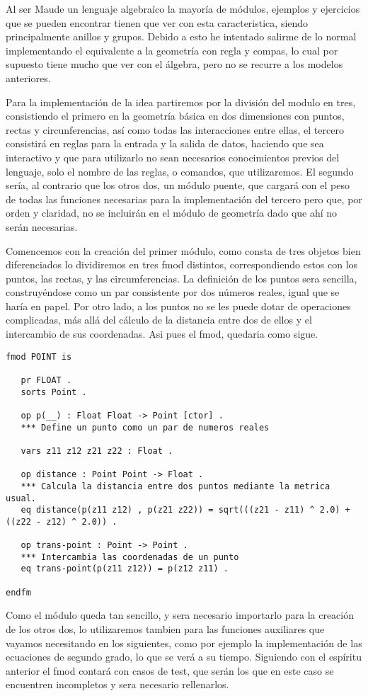 
Al ser Maude un lenguaje algebraíco la mayoría de módulos, ejemplos y ejercicios que se pueden encontrar tienen que ver con esta caracteristica, siendo principalmente anillos y grupos. Debido a esto he intentado salirme de lo normal implementando el equivalente a la geometría con regla y compas, lo cual por supuesto tiene mucho que ver con el álgebra, pero no se recurre a los modelos anteriores. \par

Para la implementación de la idea partiremos por la división del modulo en tres, consistiendo el primero en la geometría básica en dos dimensiones con puntos, rectas y circunferencias, así como todas las interacciones entre ellas, el tercero consistirá en reglas para la entrada y la salida de datos, haciendo que sea interactivo y que para utilizarlo no sean necesarios conocimientos previos del lenguaje, solo el nombre de las reglas, o comandos, que utilizaremos. El segundo sería, al contrario que los otros dos, un módulo puente, que cargará con el peso de todas las funciones necesarias para la implementación del tercero pero que, por orden y claridad, no se incluirán en el módulo de geometría dado que ahí no serán necesarias. \par

Comencemos con la creación del primer módulo, como consta de tres objetos bien diferenciados lo dividiremos en tres fmod distintos, correspondiendo estos con los puntos, las rectas, y las circumferencias. La definición de los puntos sera sencilla, construyéndose como un par consistente por dos números reales, igual que se haría en papel. Por otro lado, a los puntos no se les puede dotar de operaciones complicadas, más allá del cálculo de la distancia entre dos de ellos y el intercambio de sus coordenadas. Asi pues el fmod, quedaria como sigue.
{\codesize
\begin{verbatim}
fmod POINT is

   pr FLOAT .
   sorts Point .

   op p(__) : Float Float -> Point [ctor] .
   *** Define un punto como un par de numeros reales

   vars z11 z12 z21 z22 : Float .

   op distance : Point Point -> Float .
   *** Calcula la distancia entre dos puntos mediante la metrica usual.
   eq distance(p(z11 z12) , p(z21 z22)) = sqrt(((z21 - z11) ^ 2.0) + ((z22 - z12) ^ 2.0)) .

   op trans-point : Point -> Point .
   *** Intercambia las coordenadas de un punto
   eq trans-point(p(z11 z12)) = p(z12 z11) .

endfm
\end{verbatim}
}
Como el módulo queda tan sencillo, y sera necesario importarlo para la creación de los otros dos, lo utilizaremos tambien para las funciones auxiliares que vayamos necesitando en los siguientes, como por ejemplo la implementación de las ecuaciones de segundo grado, lo que se verá a su tiempo. Siguiendo con el espíritu anterior el fmod contará con casos de test, que serán los que en este caso se encuentren incompletos y sera necesario rellenarlos. \par

